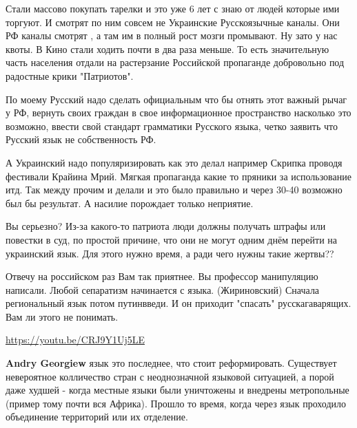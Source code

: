 \begin{itemize}
\begin{itemize}
Стали массово покупать тарелки и это уже 6 лет с знаю от людей которые ими
торгуют. И смотрят по ним совсем не Украинские Русскоязычные каналы. Они РФ
каналы смотрят , а там им в полный рост мозги промывают. Ну зато у нас квоты. В
Кино стали ходить почти в два раза меньше. То есть значительную часть населения
отдали на растерзание Российской пропаганде добровольно под радостные крики
"Патриотов". 

По моему Русский надо сделать официальным что бы отнять этот важный рычаг у РФ,
вернуть своих граждан в свое информационное пространство насколько это
возможно, ввести свой стандарт грамматики Русского языка, четко заявить что
Русский язык не собственность РФ. 

А Украинский надо популяризировать как это делал например Скрипка проводя
фестивали Крайина Мрий.  Мягкая пропаганда какие то пряники за использование
итд. Так между прочим и делали и это было правильно и через 30-40 возможно был
бы результат. А насилие порождает только неприятие.



Вы серьезно? Из-за какого-то патриота люди должны получать штрафы или повестки
в суд, по простой причине, что они не могут одним днём перейти на украинский
язык. Для этого нужно время, а ради чего нужны такие жертвы??
\end{itemize}



Отвечу на российском раз Вам так приятнее. Вы профессор манипуляцию написали.
Любой сепаратизм начинается с языка. (Жириновский) Сначала региональный язык
потом путинвведи. И он приходит "спасать" русскагаварящих. Вам ли этого не
понимать.

\url{https://youtu.be/CRJ9Y1Uj5LE}

\begin{itemize}

\textbf{Andry Georgiew} язык это последнее, что стоит реформировать. Существует
невероятное колличество стран с неоднозначной языковой ситуацией, а порой даже
худшей - когда местные языки были уничтожены и внедрены метропольные (пример
тому почти вся Африка). Прошло то время, когда через язык проходило объединение
территорий или их отделение.


\end{itemize}
\end{itemize}
